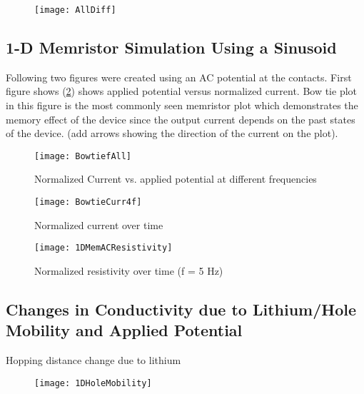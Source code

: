 {\begin{figure}[!htp]
\centering
\texttt{[image: AllDiff]}
\caption{} 
\label{AllDiff}
\end{figure}



\clearpage
\subsection{1-D Memristor Simulation Using a Sinusoid}


Following two figures were created using an AC potential at the contacts. First figure shows (\ref{Bowtie}) shows applied potential versus normalized current. Bow tie plot in this figure is the most commonly seen memristor plot which demonstrates the memory effect of the device since the output current depends on the past states of the device. (add arrows showing the direction of the current on the plot). 
\begin{landscape}
\begin{figure}[!htp]
\centering
\texttt{[image: BowtiefAll]}
\caption{Normalized Current vs. applied potential at different frequencies} 
\label{Bowtie}
\end{figure}
\end{landscape} 

   
\begin{figure}[!htp]
\centering
\texttt{[image: BowtieCurr4f]}
\caption{Normalized current over time} 
\label{}
\end{figure}


\begin{landscape}
\begin{figure}[!htp]
\centering
\texttt{[image: 1DMemACResistivity]}
\caption{Normalized resistivity over time (f = 5 Hz)} 
\label{}
\end{figure}
\end{landscape} 



\clearpage
\subsection{Changes in Conductivity due to Lithium/Hole Mobility and Applied Potential}

Hopping distance change due to lithium

\begin{figure}[!htp]
\centering
\texttt{[image: 1DHoleMobility]}
\caption{} 
\label{}
\end{figure}

}
